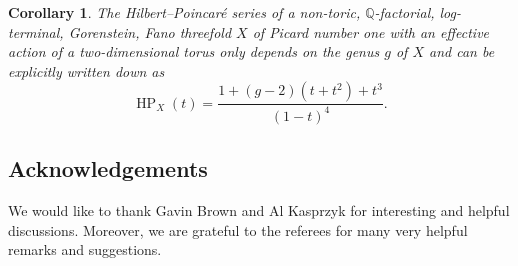 \documentclass[pdftex]{sigma}%
\newtheorem{coro}[thm]{Corollary}
\theoremstyle{definition}
\def\QQ{{\mathbb Q}}
\DeclareMathOperator\HP{HP}
\numberwithin{equation}{section}
\begin{document}
\begin{coro}
The Hilbert--Poincar\'e series of a non-toric, $\QQ$-factorial,
log-terminal, Gorenstein, Fano threefold $X$ of Picard number
one with an effective action of a two-dimensional torus only depends on the genus $g$
of $X$ and can be explicitly written down as
\[
\HP_X(t) = \frac{1 + (g-2)(t+t^2) + t^3}{(1-t)^4}.
\]
\end{coro}



\subsection*{Acknowledgements}
We would like to thank Gavin Brown and
Al Kasprzyk for interesting and helpful
discussions.
Moreover, we are grateful to the referees
for many very helpful remarks and suggestions.
\end{document}
